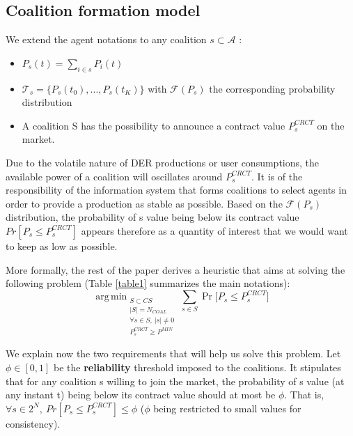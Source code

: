 \documentclass[conference]{IEEEtran}
\DeclareMathOperator*{\argmin}{arg\,min}
\begin{document}
\subsection{Coalition formation model}\label{subsec:Coalition}

We extend the agent notations to any coalition $ s \subset \mathcal{A} $ : 
\begin{itemize}
\item $ P_{s}(t) = \sum_{i \in s} P_{i}(t) $
\item $ \mathcal{T}_{s} = \{ P_{s}(t_{0}),...,P_{s}(t_{K}) \} $ with $ \mathcal{F}(P_{s}) $ the corresponding probability distribution
\item A coalition S has the possibility to announce a contract value $ P_{s}^{CRCT} $ on the market.
\end{itemize}

Due to the volatile nature of DER productions or user consumptions, the available power of a coalition will oscillates around $ P_{s}^{CRCT} $. It is of the responsibility of the information system that forms coalitions to select agents in order to provide a production as stable as possible. Based on the $ \mathcal{F}(P_{s}) $ distribution, the probability of s value being below its contract value $ Pr[P_{s} \leq P_{s}^{CRCT} ] $ appears therefore as a quantity of interest that we would want to keep as low as possible. 

More formally, the rest of the paper derives a heuristic that aims at solving the following problem (Table \ref{table1} summarizes the main notations):
 \begin{equation}
  \argmin _{\substack{ S \subset CS \\ 
                      |S| = N_{COAL} \\ 
                      \forall s \in S,\ |s| \neq 0 
                      \\ P_{s}^{CRCT} \geq P^{MIN}}}
   \sum_{s \in S}  \Pr \bigl[ P_{s} \leq P_{s}^{CRCT} \bigr]
  \label{problem}
\end{equation}  

We explain now the two requirements that will help us solve this problem. Let $ \phi \in [0,1] $ be the \textbf{reliability} threshold imposed to the coalitions. It stipulates that for any coalition s willing to join the market, the probability of s value (at any instant t) being below its contract value should at most be $ \phi $. That is, $ \forall s \in 2^{N},\ Pr[P_{s} \leq P_{s}^{CRCT} ] \leq \phi $ ($ \phi $ being restricted to small values for consistency).
\end{document}
